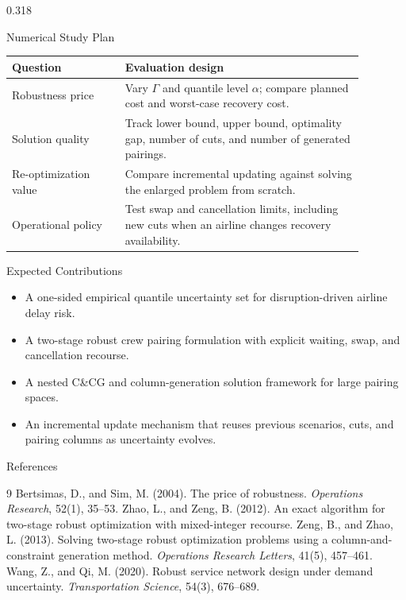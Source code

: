 \documentclass[final]{beamer}
\newcommand{\tightitem}{\setlength{\itemsep}{0.10em}\setlength{\parsep}{0pt}\setlength{\topsep}{0pt}}
\begin{document}
\begin{frame}[t]
\begin{minipage}[t]{0.968\textwidth}
\begin{columns}[t,totalwidth=\linewidth]
\begin{column}{0.318\linewidth}
\begin{exampleblock}{Numerical Study Plan}
\scriptsize
\renewcommand{\arraystretch}{1.16}
\begin{tabular}{p{0.29\linewidth}p{0.59\linewidth}}
\toprule
\textbf{Question} & \textbf{Evaluation design}\\
\midrule
Robustness price & Vary \(\Gamma\) and quantile level \(\alpha\); compare planned cost and worst-case recovery cost.\\
Solution quality & Track lower bound, upper bound, optimality gap, number of cuts, and number of generated pairings.\\
Re-optimization value & Compare incremental updating against solving the enlarged problem from scratch.\\
Operational policy & Test swap and cancellation limits, including new cuts when an airline changes recovery availability.\\
\bottomrule
\end{tabular}
\end{exampleblock}

\begin{alertblock}{Expected Contributions}
\begin{itemize}\tightitem
  \item A one-sided empirical quantile uncertainty set for disruption-driven airline delay risk.
  \item A two-stage robust crew pairing formulation with explicit waiting, swap, and cancellation recourse.
  \item A nested C\&CG and column-generation solution framework for large pairing spaces.
  \item An incremental update mechanism that reuses previous scenarios, cuts, and pairing columns as uncertainty evolves.
\end{itemize}
\end{alertblock}

\begin{block}{References}
\scriptsize
\begin{thebibliography}{9}
   Bertsimas, D., and Sim, M. (2004). The price of robustness. \emph{Operations Research}, 52(1), 35--53.
   Zhao, L., and Zeng, B. (2012). An exact algorithm for two-stage robust optimization with mixed-integer recourse.
   Zeng, B., and Zhao, L. (2013). Solving two-stage robust optimization problems using a column-and-constraint generation method. \emph{Operations Research Letters}, 41(5), 457--461.
   Wang, Z., and Qi, M. (2020). Robust service network design under demand uncertainty. \emph{Transportation Science}, 54(3), 676--689.
\end{thebibliography}
\end{block}


\end{column}
\end{columns}
\end{minipage}
\end{frame}
\end{document}
